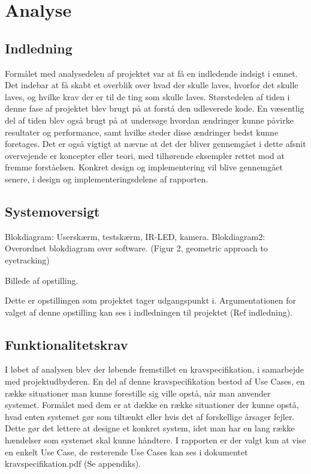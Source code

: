 \documentclass[a4paper,oneside,12pt]{article}
\begin{document}
\section{Analyse}
	\subsection{Indledning}
	Formålet med analysedelen af projektet var at få en indledende indsigt i emnet. Det indebar at få skabt et overblik over hvad der skulle laves, hvorfor det skulle laves, og hvilke krav der er til de ting som skulle laves. Størstedelen af tiden i denne fase af projektet blev brugt på at forstå den udleverede kode. En væsentlig del af tiden blev også brugt på at undersøge hvordan ændringer kunne påvirke resultater og performance, samt hvilke steder disse ændringer bedst kunne foretages. Det er også vigtigt at nævne at det der bliver gennemgået i dette afsnit overvejende er koncepter eller teori, med tilhørende eksempler rettet mod at fremme forståelsen. Konkret design og implementering vil blive gennemgået senere, i design og implementeringsdelene af rapporten.
	
	\subsection{Systemoversigt}
	
	Blokdiagram: Userskærm, testskærm, IR-LED, kamera.
	Blokdiagram2: Overordnet blokdiagram over software. (Figur 2, geometric approach to eyetracking)
	
	Billede af opstilling.
	
	
	
	
	Dette er opstillingen som projektet tager udgangspunkt i. Argumentationen for valget af denne opstilling kan ses i indledningen til projektet (Ref indledning).
	
	\subsection{Funktionalitetskrav}
	
		I løbet af analysen blev der løbende fremstillet en kravspecifikation, i samarbejde med projektudbyderen. En del af denne kravspecifikation bestod af Use Cases, en række situationer man kunne forestille sig ville opstå, når man anvender systemet. Formålet med dem er at dække en række situationer der kunne opstå, hvad enten systemet gør som tiltænkt eller hvis det af forskellige årsager fejler. Dette gør det lettere at designe et konkret system, idet man har en lang række hændelser som systemet skal kunne håndtere. I rapporten er der valgt kun at vise en enkelt Use Case, de resterende Use Cases kan ses i dokumentet kravspecifikation.pdf (Se appendiks). 
	
\end{document}
